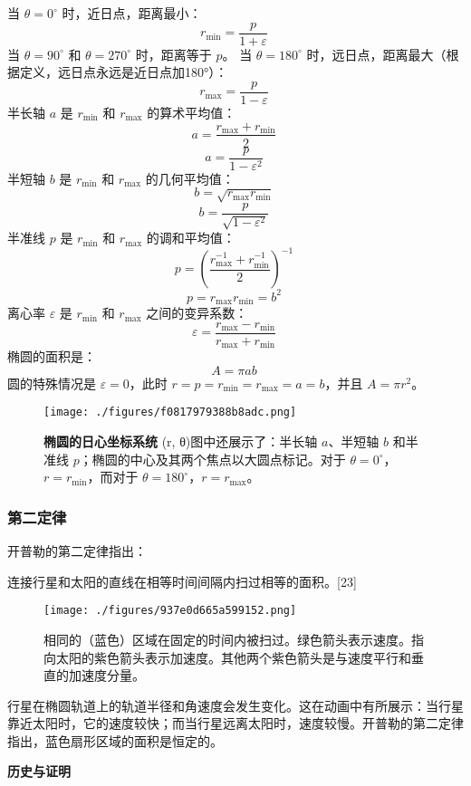 当 \( \theta = 0^\circ \) 时，近日点，距离最小：
\[
r_{\min} = \frac{p}{1 + \varepsilon}~
\]
当 \( \theta = 90^\circ \) 和 \( \theta = 270^\circ \) 时，距离等于 \( p \)。
当 \( \theta = 180^\circ \) 时，远日点，距离最大（根据定义，远日点永远是近日点加180°）：
\[
r_{\max} = \frac{p}{1 - \varepsilon}~
\]
半长轴 \( a \) 是 \( r_{\min} \) 和 \( r_{\max} \) 的算术平均值：
\[
a = \frac{r_{\max} + r_{\min}}{2}~
\]
\[
a = \frac{p}{1 - \varepsilon^2}~
\]
半短轴 \( b \) 是 \( r_{\min} \) 和 \( r_{\max} \) 的几何平均值：
\[
b = \sqrt{r_{\max} r_{\min}}~
\]
\[
b = \frac{p}{\sqrt{1 - \varepsilon^2}}~
\]
半准线 \( p \) 是 \( r_{\min} \) 和 \( r_{\max} \) 的调和平均值：
\[
p = \left( \frac{r_{\max}^{-1} + r_{\min}^{-1}}{2} \right)^{-1}~
\]
\[p = r_{\max} r_{\min} = b^2~\]
离心率 \( \varepsilon \) 是 \( r_{\min} \) 和 \( r_{\max} \) 之间的变异系数：
\[
\varepsilon = \frac{r_{\max} - r_{\min}}{r_{\max} + r_{\min}}~
\]
椭圆的面积是：
\[
A = \pi ab~
\]
圆的特殊情况是 \( \varepsilon = 0 \)，此时 \( r = p = r_{\min} = r_{\max} = a = b \)，并且 \( A = \pi r^2 \)。
\begin{figure}[ht]
\centering
\texttt{[image: ./figures/f0817979388b8adc.png]}
\caption{\textbf{椭圆的日心坐标系统} (r, θ)图中还展示了：半长轴 \(a\)、半短轴 \(b\) 和半准线 \(p\)；椭圆的中心及其两个焦点以大圆点标记。对于 \( \theta = 0^\circ \)，\( r = r_{\min} \)，而对于 \( \theta = 180^\circ \)，\( r = r_{\max} \)。} \label{fig_KPL_3}
\end{figure}
\subsubsection{第二定律}  
开普勒的第二定律指出：

连接行星和太阳的直线在相等时间间隔内扫过相等的面积。[23]
\begin{figure}[ht]
\centering
\texttt{[image: ./figures/937e0d665a599152.png]}
\caption{相同的（蓝色）区域在固定的时间内被扫过。绿色箭头表示速度。指向太阳的紫色箭头表示加速度。其他两个紫色箭头是与速度平行和垂直的加速度分量。} \label{fig_KPL_4}
\end{figure}
行星在椭圆轨道上的轨道半径和角速度会发生变化。这在动画中有所展示：当行星靠近太阳时，它的速度较快；而当行星远离太阳时，速度较慢。开普勒的第二定律指出，蓝色扇形区域的面积是恒定的。

\textbf{历史与证明}


